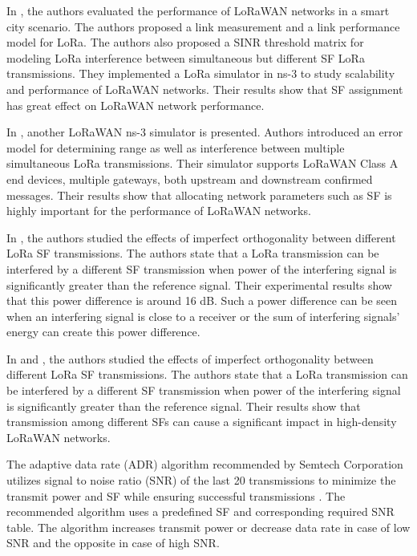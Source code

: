 \documentclass[conference]{IEEEtran}
\begin{document}
In \cite{7996384}, the authors evaluated the performance of LoRaWAN networks in a smart city scenario. The authors proposed a link measurement and a link performance model for LoRa. The authors also proposed a SINR threshold matrix for modeling LoRa interference between simultaneous but different SF LoRa transmissions. They implemented a LoRa simulator in ns-3 to study scalability and performance of LoRaWAN networks. Their results show that SF assignment has great effect on LoRaWAN network performance.

In \cite{8090518}, another LoRaWAN ns-3 simulator is presented. Authors introduced an error model for determining range as well as interference between multiple simultaneous LoRa transmissions. Their simulator supports LoRaWAN Class A end devices, multiple gateways, both upstream and downstream confirmed messages. Their results show that allocating network parameters such as SF is highly important for the performance of LoRaWAN networks.

In \cite{8267219}, the authors studied the effects of imperfect orthogonality between different LoRa SF transmissions. The authors state that a LoRa transmission can be interfered by a different SF transmission when power of the interfering signal is significantly greater than the reference signal. Their experimental results show that this power difference is around 16 dB. Such a power difference can be seen when an interfering signal is close to a receiver or the sum of interfering signals' energy can create this power difference.

\par In \cite{8267219} and \cite{8430542}, the authors studied the effects of imperfect orthogonality between different LoRa SF transmissions. The authors state that a LoRa transmission can be interfered by a different SF transmission when power of the interfering signal is significantly greater than the reference signal. Their results show that transmission among different SFs can cause a significant impact in high-density LoRaWAN networks.

The adaptive data rate (ADR) algorithm recommended by Semtech Corporation utilizes signal to noise ratio (SNR) of the last 20 transmissions to minimize the transmit power and SF while ensuring successful transmissions \cite{lorawan_adr}. The recommended algorithm uses a predefined SF and corresponding required SNR table. The algorithm increases transmit power or decrease data rate in case of low SNR and the opposite in case of high SNR.
\end{document}
